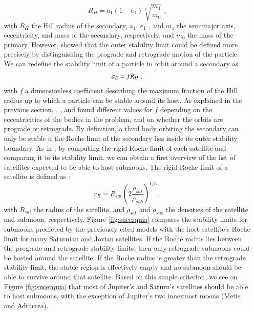\documentclass{aa}
\begin{document}
\begin{equation}
    R_H = a_1\left(1-e_1\right)\sqrt[3]{\frac{m_1}{m_0}} \text{ ,}
\end{equation}with $R_H$ the Hill radius of the secondary, $a_1$, $e_1$ , and $m_1$  the semimajor axis, eccentricity, and mass of the secondary, respectively, and $m_0$ the mass of the primary.
However, \cite{Domingos_2006} showed that the outer stability limit could be defined more precisely by distinguishing the prograde and retrograde motion of the particle. We can redefine the stability limit of a particle in orbit around a secondary as 
\begin{equation}
    a_E = f \space R_H \text{ ,}
\end{equation}with $f$ a dimensionless coefficient describing the maximum fraction of the Hill radius up to which a particle can be stable around its host. As explained in the previous section, \cite{Domingos_2006}, \cite{Rosario-Franco_2020}, and \cite{Quarles_2021} found different values for $f$ depending on the eccentricities of the bodies in the problem, and on whether the orbits are prograde or retrograde.
By definition, a third body orbiting the secondary can only be stable if the Roche limit of the secondary lies inside its outer stability boundary. 
As in \cite{Sucerquia2024}, by computing the rigid Roche limit of each satellite and comparing it to its stability limit, we can obtain a first overview of the list of satellites expected to be able to host submoons. The rigid Roche limit of a satellite is defined as \citep{Aggarwal_1974,Sucerquia2024}:
\begin{equation}
    r_R = R_{sat}\left(2\frac{\rho_{sat}}{\rho_{sub}}\right)^{1/3}
,\end{equation}with $R_{sat}$ the radius of the satellite, and $\rho_{sat}$ and $\rho_{sub}$ the densities of the satellite and submoon, respectively. Figure \ref{fig:sucerquia} compares the stability limits for submoons predicted by the previously cited models with the host satellite's Roche limit for many Saturnian and Jovian satellites. If the Roche radius lies between the prograde and retrograde stability limits, then only retrograde submoons could be hosted around the satellite. If the Roche radius is greater than the retrograde stability limit, the stable region is effectively empty and no submoon should be able to survive around that satellite. Based on this simple criterion, we see on Figure \ref{fig:sucerquia} that most of Jupiter's and Saturn's satellites should be able to host submoons, with the exception of Jupiter's two innermost moons (Metis and Adrastea).
\end{document}
